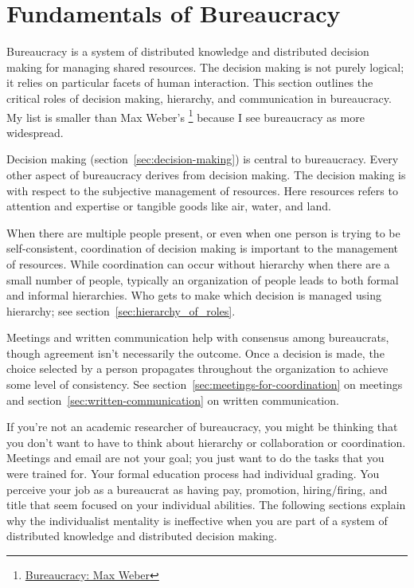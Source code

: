 \section{Fundamentals of Bureaucracy\label{fundamentals_of_b}}
  
Bureaucracy is a system of distributed knowledge and distributed decision making for managing shared resources. The decision making is not purely logical; it relies on particular facets of human interaction. This section outlines the critical roles of decision making, hierarchy, and communication in bureaucracy. 
My list is smaller than Max Weber's \cite{2015_Weber}\footnote{\href{https://en.wikipedia.org/wiki/Bureaucracy\#Max_Weber}{Bureaucracy: Max Weber}} because I see bureaucracy as more widespread.

Decision making (section~\ref{sec:decision-making}) is central to bureaucracy. Every other aspect of bureaucracy derives from decision making. The decision making is with respect to the subjective management of resources. Here resources refers to attention and expertise or tangible goods like air, water, and land. 

When there are multiple people present, or even when one person is trying to be self-consistent, coordination of decision making is important to the management of resources. While coordination can occur without hierarchy when there are a small number of people, typically an organization of people leads to both formal and informal hierarchies. Who gets to make which decision is managed using hierarchy; see section~\ref{sec:hierarchy_of_roles}.

Meetings and written communication help with consensus among bureaucrats, though agreement isn't necessarily the outcome.
Once a decision is made, the choice selected by a person propagates throughout the organization to achieve some level of consistency. See section~\ref{sec:meetings-for-coordination} on meetings and section~\ref{sec:written-communication} on written communication.

If you're not an academic researcher of bureaucracy, you might be thinking that you don't want to have to think about hierarchy or collaboration or coordination. Meetings and email are not your goal; you just want to do the tasks that you were trained for. Your formal education process had individual grading. You perceive your job as a bureaucrat as having pay, promotion, hiring/firing, and title that  seem focused on your individual abilities. The following sections explain why the individualist mentality is ineffective when you are part of a  system of distributed knowledge and distributed decision making. 


